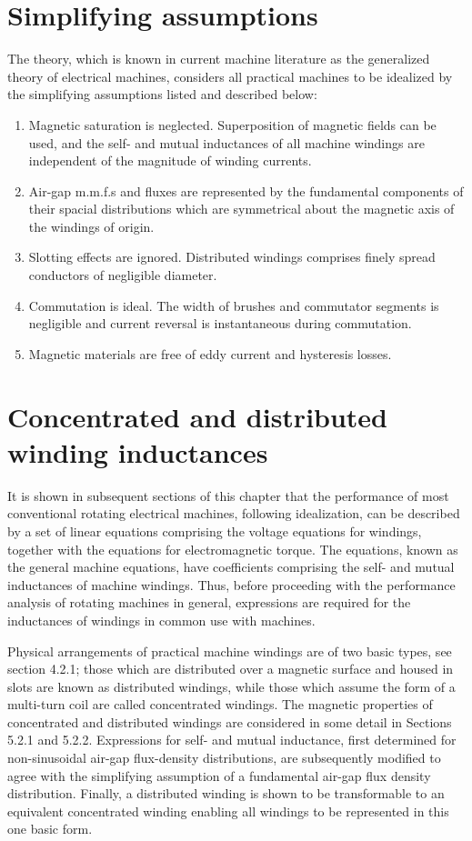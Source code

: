 \documentclass[a4paper,numbers=noenddot,12pt]{scrbook}
\begin{document}
        \section{Simplifying assumptions}
        The theory, which is known in current machine literature as the generalized theory of electrical machines, considers all practical machines to be idealized by the simplifying assumptions listed and described below:
        \begin{enumerate}
            \item Magnetic saturation is neglected. Superposition of magnetic fields can be  used, and the self- and mutual inductances of all machine windings are independent of the magnitude of winding currents.
            \item Air-gap m.m.f.s and fluxes are represented by the fundamental components of their spacial distributions which are symmetrical about the magnetic axis of the windings of origin.
            \item Slotting effects are ignored. Distributed windings comprises finely spread conductors of negligible diameter.
            \item Commutation is ideal. The width of brushes and commutator segments is negligible and current reversal is instantaneous during commutation.
            \item Magnetic materials are free of eddy current and hysteresis losses.
        \end{enumerate}
        \section{Concentrated and distributed winding inductances}
        It is shown in subsequent sections of this chapter that the performance of most conventional rotating electrical machines, following idealization, can be described by a set of linear equations comprising the voltage equations for windings, together with the equations for electromagnetic torque. The equations, known as the general machine equations, have coefficients comprising the self- and mutual inductances of machine windings. Thus, before proceeding with the performance analysis of rotating machines in general, expressions are required for the inductances of windings in common use with machines.

        Physical arrangements of practical machine windings are of two basic types, see section 4.2.1; those which are distributed over a magnetic surface and housed in slots are known as distributed windings, while those which assume the form of a multi-turn coil are called concentrated windings. The magnetic properties of concentrated and distributed windings are considered in some detail in Sections 5.2.1 and 5.2.2. Expressions for self- and mutual inductance, first determined for non-sinusoidal air-gap flux-density distributions, are subsequently modified to agree with the simplifying assumption of a fundamental air-gap flux density distribution. Finally, a distributed winding is shown to be transformable to an equivalent concentrated winding enabling all windings to be represented in this one basic form.
\end{document}
